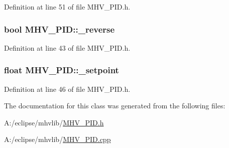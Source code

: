 Definition at line 51 of file M\-H\-V\-\_\-\-P\-I\-D.\-h.

\hypertarget{class_m_h_v___p_i_d_ae47baf90291256480ae57cbbc1ed917c}{
\subsubsection[{\-\_\-reverse}]{\setlength{\rightskip}{0pt plus 5cm}bool M\-H\-V\-\_\-\-P\-I\-D\-::\-\_\-reverse\hspace{0.3cm}{\ttfamily [protected]}}}\label{class_m_h_v___p_i_d_ae47baf90291256480ae57cbbc1ed917c}


Definition at line 43 of file M\-H\-V\-\_\-\-P\-I\-D.\-h.

\hypertarget{class_m_h_v___p_i_d_a46322bf586cac91fef5c2e38f269c718}{
\subsubsection[{\-\_\-setpoint}]{\setlength{\rightskip}{0pt plus 5cm}float M\-H\-V\-\_\-\-P\-I\-D\-::\-\_\-setpoint\hspace{0.3cm}{\ttfamily [protected]}}}\label{class_m_h_v___p_i_d_a46322bf586cac91fef5c2e38f269c718}


Definition at line 46 of file M\-H\-V\-\_\-\-P\-I\-D.\-h.



The documentation for this class was generated from the following files\-:\begin{DoxyCompactItemize}
\item 
A\-:/eclipse/mhvlib/\hyperlink{_m_h_v___p_i_d_8h}{M\-H\-V\-\_\-\-P\-I\-D.\-h}\item 
A\-:/eclipse/mhvlib/\hyperlink{_m_h_v___p_i_d_8cpp}{M\-H\-V\-\_\-\-P\-I\-D.\-cpp}\end{DoxyCompactItemize}
